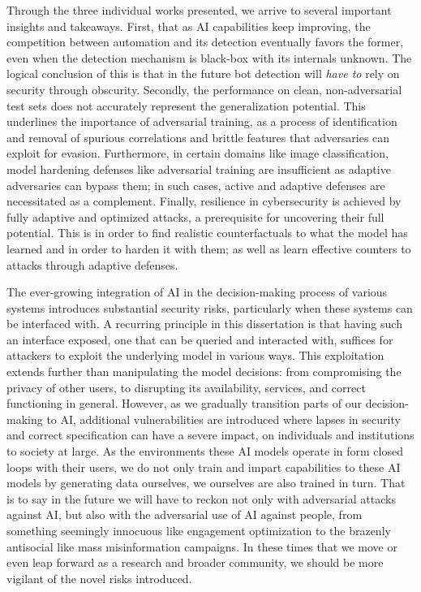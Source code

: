 Through the three individual works presented, we arrive to several important insights and takeaways.
First, that as \gls{AI} capabilities keep improving, the competition between automation and its detection eventually favors the former, even when the detection mechanism is black-box with its internals unknown.
The logical conclusion of this is that in the future bot detection will \textit{have to} rely on security through obscurity.
Secondly, the performance on clean, non-adversarial test sets does not accurately represent the generalization potential.
This underlines the importance of adversarial training, as a process of identification and removal of spurious correlations and brittle features that adversaries can exploit for evasion.
Furthermore, in certain domains like image classification, model hardening defenses like adversarial training are insufficient as adaptive adversaries can bypass them; in such cases, active and adaptive defenses are necessitated as a complement.
Finally, resilience in cybersecurity is achieved by fully adaptive and optimized attacks, a prerequisite for uncovering their full potential.
This is in order to find realistic counterfactuals to what the model has learned and in order to harden it with them; as well as learn effective counters to attacks through adaptive defenses.

The ever-growing integration of \gls{AI} in the decision-making process of various systems introduces substantial security risks, particularly when these systems can be interfaced with.
A recurring principle in this dissertation is that having such an interface exposed, one that can be queried and interacted with, suffices for attackers to exploit the underlying model in various ways.
This exploitation extends further than manipulating the model decisions: from compromising the privacy of other users, to disrupting its availability, services, and correct functioning in general.
However, as we gradually transition parts of our decision-making to AI, additional vulnerabilities are introduced where lapses in security and correct specification can have a severe impact, on individuals and institutions to society at large. 
As the environments these AI models operate in form closed loops with their users, we do not only train and impart capabilities to these \gls{AI} models by generating data ourselves, we ourselves are also trained in turn.
That is to say in the future we will have to reckon not only with adversarial attacks against \gls{AI}, but also with the adversarial use of \gls{AI} against people, from something seemingly innocuous like engagement optimization to the brazenly antisocial like mass misinformation campaigns.
In these times that we move or even leap forward as a research and broader community, we should be more vigilant of the novel risks introduced.

